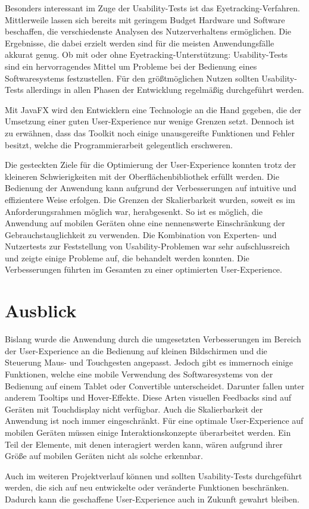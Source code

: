 Besonders interessant im Zuge der Usability-Tests ist das Eyetracking-Verfahren. Mittlerweile lassen sich bereits mit geringem Budget Hardware und Software beschaffen, die verschiedenste Analysen des Nutzerverhaltens ermöglichen. Die Ergebnisse, die dabei erzielt werden sind für die meisten Anwendungsfälle akkurat genug. Ob mit oder ohne Eyetracking-Unterstützung: Usability-Tests sind ein hervorragendes Mittel um Probleme bei der Bedienung eines Softwaresystems festzustellen. Für den größtmöglichen Nutzen sollten Usability-Tests allerdings in allen Phasen der Entwicklung regelmäßig durchgeführt werden.\par
Mit JavaFX wird den Entwicklern eine Technologie an die Hand gegeben, die der Umsetzung einer guten User-Experience nur wenige Grenzen setzt. Dennoch ist zu erwähnen, dass das Toolkit noch einige unausgereifte Funktionen und Fehler besitzt, welche die Programmierarbeit gelegentlich erschweren.\par
Die gesteckten Ziele für die Optimierung der User-Experience konnten trotz der kleineren Schwierigkeiten mit der Oberflächenbibliothek erfüllt werden. Die Bedienung der Anwendung kann aufgrund der Verbesserungen auf intuitive und effizientere Weise erfolgen. Die Grenzen der Skalierbarkeit wurden, soweit es im Anforderungsrahmen möglich war, herabgesenkt. So ist es möglich, die Anwendung auf mobilen Geräten ohne eine nennenswerte Einschränkung der Gebrauchstauglichkeit zu verwenden. Die Kombination von Experten- und Nutzertests zur Feststellung von Usability-Problemen war sehr aufschlussreich und zeigte einige Probleme auf, die behandelt werden konnten. Die Verbesserungen führten im Gesamten zu einer optimierten User-Experience.\par
\section{Ausblick}
Bislang wurde die Anwendung durch die umgesetzten Verbesserungen im Bereich der User-Experience an die Bedienung auf kleinen Bildschirmen und die Steuerung Maus- und Touchgesten angepasst. Jedoch gibt es immernoch einige Funktionen, welche eine mobile Verwendung des Softwaresystems von der Bedienung auf einem Tablet oder Convertible unterscheidet. Darunter fallen unter anderem Tooltips und Hover-Effekte. Diese Arten visuellen Feedbacks sind auf Geräten mit Touchdisplay nicht verfügbar. Auch die Skalierbarkeit der Anwendung ist noch immer eingeschränkt. Für eine optimale User-Experience auf mobilen Geräten müssen einige Interaktionskonzepte überarbeitet werden. Ein Teil der Elemente, mit denen interagiert werden kann, wären aufgrund ihrer Größe auf mobilen Geräten nicht als solche erkennbar.\par
Auch im weiteren Projektverlauf können und sollten Usability-Tests durchgeführt werden, die sich auf neu entwickelte oder veränderte Funktionen beschränken. Dadurch kann die geschaffene User-Experience auch in Zukunft gewahrt bleiben.\par